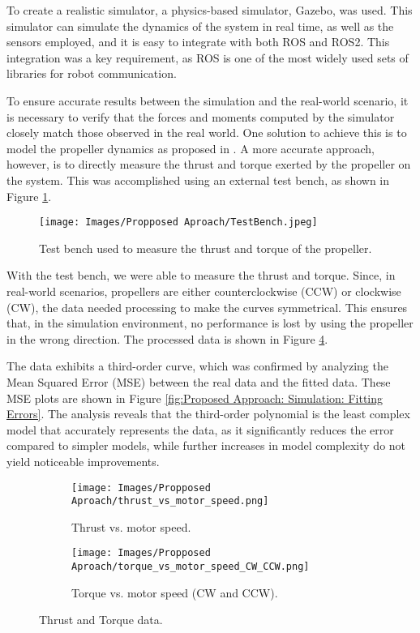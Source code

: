 To create a realistic simulator, a physics-based simulator, Gazebo, was used. This simulator can simulate the dynamics of the system in real time, as well as the sensors employed, and it is easy to integrate with both ROS and ROS2. This integration was a key requirement, as ROS is one of the most widely used sets of libraries for robot communication. 

To ensure accurate results between the simulation and the real-world scenario, it is necessary to verify that the forces and moments computed by the simulator closely match those observed in the real world. One solution to achieve this is to model the propeller dynamics as proposed in \cite{martin2010true}. A more accurate approach, however, is to directly measure the thrust and torque exerted by the propeller on the system. This was accomplished using an external test bench, as shown in Figure \ref{fig:Proposed Approach:Simulator:Testbench}.

\begin{figure}[H]
    \centering
    \texttt{[image: Images/Propposed Aproach/TestBench.jpeg]}
    \caption{Test bench used to measure the thrust and torque of the propeller.}
    \label{fig:Proposed Approach:Simulator:Testbench}
\end{figure}

With the test bench, we were able to measure the thrust and torque. Since, in real-world scenarios, propellers are either counterclockwise (CCW) or clockwise (CW), the data needed processing to make the curves symmetrical. This ensures that, in the simulation environment, no performance is lost by using the propeller in the wrong direction. The processed data is shown in Figure \ref{fig:Proposed Approach: Simulation: Motor Data}. 

The data exhibits a third-order curve, which was confirmed by analyzing the Mean Squared Error (MSE) between the real data and the fitted data. These MSE plots are shown in Figure \ref{fig:Proposed Approach: Simulation: Fitting Errors}. The analysis reveals that the third-order polynomial is the least complex model that accurately represents the data, as it significantly reduces the error compared to simpler models, while further increases in model complexity do not yield noticeable improvements.

\begin{figure}[H]
    \begin{subfigure}{0.5\textwidth}
        \centering
        \texttt{[image: Images/Propposed Aproach/thrust\_vs\_motor\_speed.png]}
        \caption{Thrust vs. motor speed.}
        \label{fig:proposed_approach_simulation_motor_data_thrust}
    \end{subfigure}
    \hfill
    \begin{subfigure}{0.5\textwidth}
        \centering
        \texttt{[image: Images/Propposed Aproach/torque\_vs\_motor\_speed\_CW\_CCW.png]}
        \caption{Torque vs. motor speed (CW and CCW).}
        \label{fig:proposed_approach_simulation_motor_data_torque}
    \end{subfigure}
    \caption{Thrust and Torque data.}
    \label{fig:Proposed Approach: Simulation: Motor Data}
\end{figure}

